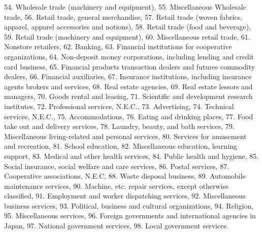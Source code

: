 \documentclass[pre,floatfix,twocolumn,showpacs,a4paper,nofootinbib]{revtex4}
\begin{document}
54. Wholesale trade (machinery and equipment), 55. Miscellaneous Wholesale trade, 56. Retail trade, general merchandise, 57. Retail trade (woven fabrics, apparel, apparel accessories and notions),
58. Retail trade (food and beverage), 59. Retail trade (machinery and equipment), 60. Miscellaneous retail trade, 61. Nonstore retailers, 62. Banking, 63. Financial institutions for cooperative organizations,
64. Non-deposit money corporations, including lending and credit card business, 65. Financial products transaction dealers and futures commodity dealers, 66. Financial auxiliaries,
67. Insurance institutions, including insurance agents brokers and services, 68. Real estate agencies, 69. Real estate lessors and managers, 70. Goods rental and leasing,
71. Scientific and development research institutes, 72. Professional services, N.E.C., 73. Advertising, 74. Technical services, N.E.C., 75. Accommodations, 
76. Eating and drinking places, 77. Food take out and delivery services, 78. Laundry, beauty, and bath services, 79. Miscellaneous living-related and personal services, 
80. Services for amusement and recreation, 81. School education, 82. Miscellaneous education, learning support, 83. Medical and other health services, 84. Public health and hygiene,
85. Social insurance, social welfare and care services, 86. Postal services, 87. Cooperative associations, N.E.C, 88. Waste disposal business, 89. Automobile maintenance services,
90. Machine, etc. repair services, except otherwise classified, 91. Employment and worker dispatching services, 92. Miscellaneous business services, 93. Political, business and cultural organizations, 
94. Religion, 95. Miscellaneous services, 96. Foreign governments and international agencies in Japan, 97. National government services, 98. Local government services. 
\end{document}
